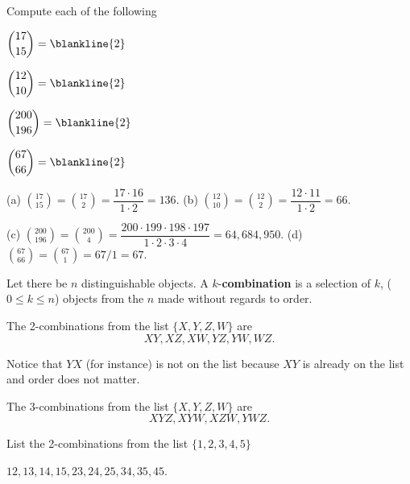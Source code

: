 \begin{exer}
Compute each of the following
\begin{lenum}
\item
$\displaystyle\binom{17}{15} =\blankline{2}$
\item
 $\displaystyle\binom{12}{10}  = \blankline{2}$
\item
$\displaystyle\binom{200}{196} = \blankline{2}$
\item
$\displaystyle\binom{67}{66} = \blankline{2}$
\end{lenum}
\begin{answer}
(a) $\displaystyle\binom{17}{15} = \displaystyle\binom{17}{2}=\dfrac{17\cdot 16}{1\cdot 2} = 136$.
(b) $\displaystyle\binom{12}{10} = \displaystyle\binom{12}{2}=\dfrac{12\cdot 11}{1\cdot 2} = 66$.

\noindent
(c) $\displaystyle\binom{200}{196}=\displaystyle\binom{200}{4}=\dfrac{200\cdot 199\cdot 198\cdot 197}{1\cdot 2\cdot 3\cdot 4} =64,684,950$.
(d) $\displaystyle\binom{67}{66}=\displaystyle\binom{67}{1}=67/1=67$.
\end{answer}
\end{exer}

\newpage

\begin{df}
Let there be $n$ distinguishable objects. A $k$-{\bf combination} is
a selection of $k$, ($0 \leq k \leq n$) objects from the $n$ made
without regards to order.
\end{df}
\begin{exa} The
2-combinations from the list $\{X, Y, Z, W\}$ are
$$XY, XZ, XW, YZ, YW, WZ.$$

\noindent
Notice that $YX$ (for instance) is not on the list because $XY$ is already
on the list and order does not matter.
\end{exa}

\begin{exa} The
3-combinations from the list $\{X, Y, Z,W\}$ are
$$XYZ, XYW, XZW,  YWZ.$$
\end{exa}


\begin{exer} List the 2-combinations from the list $\{1, 2, 3, 4, 5\}$

\noindent
\answerlinetwo
\begin{answer}
$12, 13, 14, 15, 23, 24, 25, 34, 35, 45$.
\end{answer}
\end{exer}

